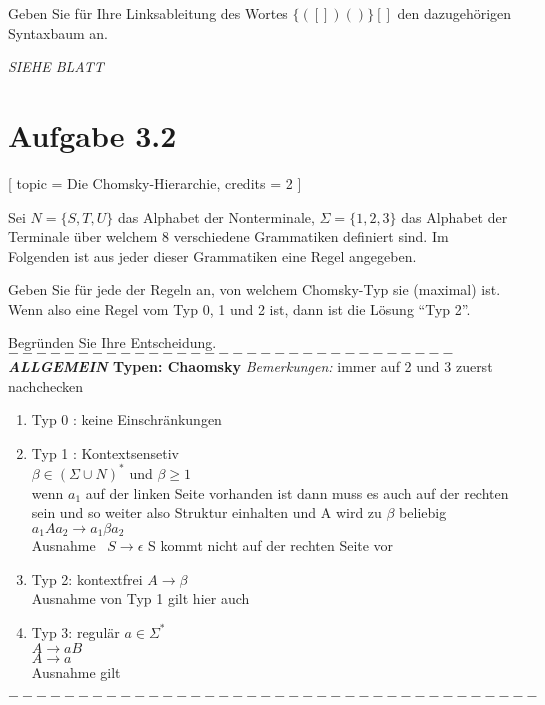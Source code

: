 \documentclass[12pt]{article}
\begin{document}
 Geben Sie für Ihre Linksableitung des Wortes $\{([])()\}[]$ den dazugehörigen Syntaxbaum an. 
  
\textit{  \emph{SIEHE BLATT}
} \section*{Aufgabe 3.2} [ 
 topic = Die Chomsky-Hierarchie, 
 credits = 2 
 ] 
  
 Sei $N = \{S,T,U\}$ das Alphabet der Nonterminale, $\Sigma = \{1,2,3\}$ das Alphabet der Terminale über welchem 8 verschiedene Grammatiken definiert sind. Im Folgenden ist aus jeder dieser Grammatiken eine Regel angegeben.  
  
 Geben Sie für jede der Regeln an, von welchem Chomsky-Typ sie (maximal) ist. Wenn also eine Regel vom Typ 0, 1 und 2 ist, dann ist die Lösung "`Typ 2"'. 
  
 Begründen Sie Ihre Entscheidung.  \\
  $--------------------------------$
\textbf{\textit{ALLGEMEIN} Typen: Chaomsky
}
 \textit{Bemerkungen:} immer auf 2 und 3 zuerst nachchecken

\begin{enumerate}
\item   Typ 0 : keine Einschränkungen
\item   Typ 1 : Kontextsensetiv \\
 $\beta\in(\Sigma \cup N)^*$ und $\beta \geq 1$ \\
wenn $a_1$ auf der linken Seite vorhanden ist dann muss es auch auf der rechten sein und so weiter also Struktur einhalten und A wird zu $\beta$ beliebig\\
    $a_1Aa_2 \rightarrow a_1 \beta a_2$\\
     Ausnahme \
    $S \rightarrow \epsilon$
     S kommt nicht auf der rechten Seite vor
\item   Typ 2: kontextfrei
    $A \rightarrow \beta$\\
    Ausnahme von Typ 1 gilt hier auch
\item Typ 3: regulär 
$a\in \Sigma^*$ \\
    $A \rightarrow aB$ \\
    $A \rightarrow a $\\
     Ausnahme gilt\
     
\end{enumerate}
$--------------------------------------$\\ \\
\end{document}

